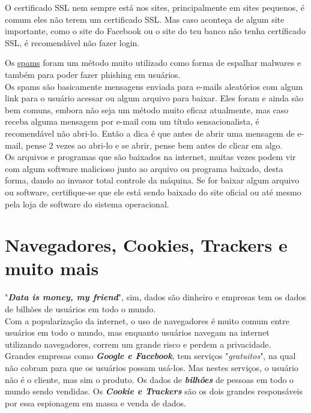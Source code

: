 \documentclass[12pt, letterpaper, DejaVuSansMono:12]{report}
\begin{document}
	O certificado SSL nem sempre está nos sites, principalmente em sites pequenos, é comum eles não terem um certificado SSL. Mas caso aconteça de algum site importante, como o site do Facebook ou o site do teu banco não tenha certíficado SSL, é recomendável não fazer login.\\

\pagebreak

	Os \href{https://criptowiki.miraheze.org/wiki/Spam}{spams} foram um método muito utilizado como forma de espalhar malwares e também para poder fazer phishing em usuários.\\

	Os spams são basicamente mensagens enviada para e-mails aleatórios com algum link para o usuário acessar ou algum arquivo para baixar. Eles foram e ainda são bem comuns, embora não seja um método muito eficaz atualmente, mas caso receba alguma mensagem por e-mail com um título sensacionalista, é recomendável não abri-lo. Então a dica é que antes de abrir uma mensagem de e-mail, pense 2 vezes ao abri-lo e se abrir, pense bem antes de clicar em algo.\\

	Os arquivos e programas que são baixados na internet, muitas vezes podem vir com algum software malicioso junto ao arquivo ou programa baixado, desta forma, dando ao invasor total controle da máquina. Se for baixar algum arquivo ou software, certifique-se que ele está sendo baixado do site oficial ou até mesmo pela loja de software do sistema operacional.\\

\pagebreak

\section{Navegadores, Cookies, Trackers e muito mais}
	"\textbf{\textit{Data is money, my friend}}", sim, dados são dinheiro e empresas tem os dados de bilhões de usuários em todo o mundo.\\

	Com a popularização da internet, o uso de navegadores é muito comum entre usuários em todo o mundo, mas enquanto usuários navegam na internet utilizando navegadores, correm um grande risco e perdem a privacidade.\\

	Grandes empresas como \textit{\textbf{Google e Facebook}}, tem serviços "\textit{gratuitos}", na qual não cobram para que os usuários possam usá-los. Mas nestes serviços, o usuário não é o cliente, mas sim o produto. Os dados de \textit{\textbf{bilhões}} de pessoas em todo o mundo sendo vendidas. Os \textit{\textbf{Cookie e Trackers}} são os dois grandes responsáveis por essa espionagem em massa e venda de dados.
\end{document}
